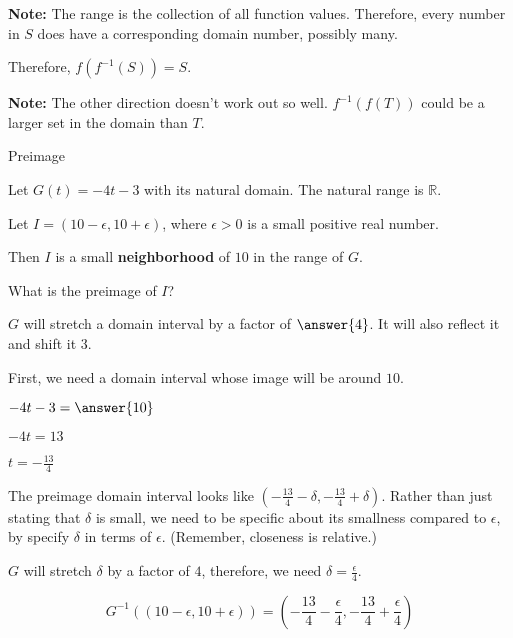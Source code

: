 \documentclass{ximera}
\begin{document}
\textbf{Note:}  The range is the collection of all function values. Therefore, every number in $S$ does have a corresponding domain number, possibly many.

Therefore, $f(f^{-1}(S)) = S$.


\textbf{Note:}  The other direction doesn't work out so well. $f^{-1}(f(T))$ could be a larger set in the domain than $T$.







\begin{example} Preimage

Let $G(t) = -4t - 3$ with its natural domain.  The natural range is $\mathbb{R}$.

Let  $I = (10-\epsilon, 10+\epsilon)$, where $\epsilon > 0$ is a small positive real number.  

Then $I$ is a small \textbf{neighborhood} of $10$ in the range of $G$.


What is the preimage of $I$?

\begin{explanation}





$G$ will stretch a domain interval by a factor of $\answer{4}$.  It will also reflect it and shift it $3$.  


First, we need a domain interval whose image will be around $10$.

$-4t-3 = \answer{10}$

$-4t = 13$

$t = -\frac{13}{4}$



The preimage domain interval looks like $\left( -\frac{13}{4} - \delta, -\frac{13}{4} + \delta \right)$.  Rather than just stating that $\delta$ is small, we need to be specific about its smallness compared to $\epsilon$, by specify $\delta$ in terms of $\epsilon$. (Remember, closeness is relative.)

$G$ will stretch $\delta$ by a factor of $4$, therefore,  we need $\delta = \frac{\epsilon}{4}$. 




\[   G^{-1}((10-\epsilon, 10+\epsilon)) = \left( -\frac{13}{4} - \frac{\epsilon}{4}, -\frac{13}{4} + \frac{\epsilon}{4} \right)   \]


\end{explanation}




\end{example}
\end{document}
